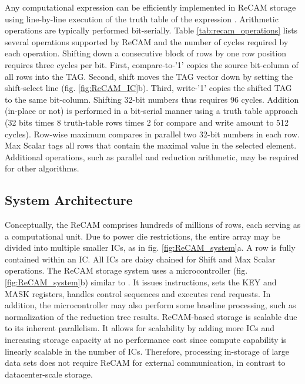 \documentclass{superfri}
\begin{document}
	Any computational expression can be efficiently implemented in ReCAM storage using line-by-line execution of the truth table of the expression \cite{balasubramonian2014near}. Arithmetic operations are typically performed bit-serially. Table \ref{tab:recam_operations} lists several operations supported by ReCAM and the number of cycles required by each operation.  Shifting down a consecutive block of rows by one row position requires three cycles per bit. First, compare-to-'1' copies the source bit-column of all rows into the TAG. Second, shift moves the TAG vector down by setting the shift-select line (fig. \ref{fig:ReCAM_IC}b). Third, write-'1' copies the shifted TAG to the same bit-column. Shifting 32-bit numbers thus requires 96 cycles. Addition (in-place or not) is performed in a bit-serial manner using a truth table approach \cite{balasubramonian2014near} (32 bits times 8 truth-table rows times 2 for compare and write amount to 512 cycles). Row-wise maximum compares in parallel two 32-bit numbers in each row. Max Scalar tags all rows that contain the maximal value in the selected element. Additional operations, such as parallel and reduction arithmetic, may be required for other algorithms. 
	
	
	\subsection{System Architecture}
	\label{sec:system_architecture}
	Conceptually, the ReCAM comprises hundreds of millions of rows, each serving as a computational unit. Due to power die restrictions, the entire array may be divided into multiple smaller ICs, as in fig. \ref{fig:ReCAM_system}a. A row is fully contained within an IC. All ICs are daisy chained for Shift and Max Scalar operations.
	The ReCAM storage system uses a microcontroller (fig. \ref{fig:ReCAM_system}b) similar to \cite{guo2013ac}. It issues instructions, sets the KEY and MASK registers, handles control sequences and executes read requests. In addition, the microcontroller may also perform some baseline processing, such as normalization of the reduction tree results.
	ReCAM-based storage is scalable due to its inherent parallelism. It allows for scalability by adding more ICs and increasing storage capacity at no performance cost since compute capability is linearly scalable in the number of ICs. Therefore, processing in-storage of large data sets does not require ReCAM for external communication, in contrast to datacenter-scale storage. 
	
\end{document}
